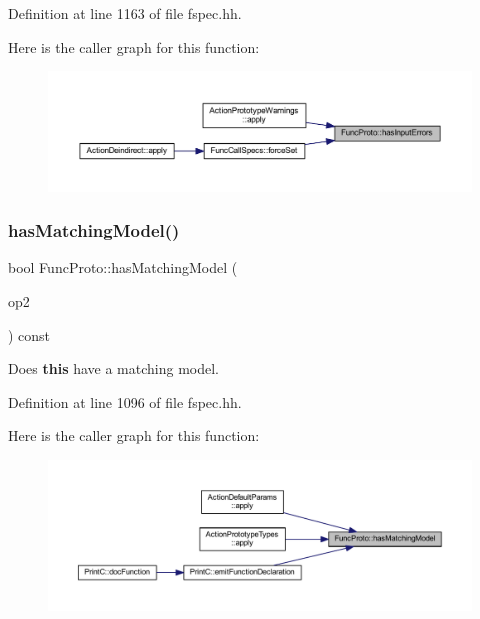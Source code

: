 Definition at line 1163 of file fspec.\+hh.

Here is the caller graph for this function\+:
\nopagebreak
\begin{figure}[H]
\begin{center}
\leavevmode
\includegraphics[width=350pt]{class_func_proto_abeba6c216afa6ad43160d69a10433fab_icgraph}
\end{center}
\end{figure}
\mbox{\label{class_func_proto_afeebd3dd7e300e1361977b93c72a8eed}} 
\subsubsection{\texorpdfstring{hasMatchingModel()}{hasMatchingModel()}\hspace{0.1cm}{\footnotesize\ttfamily [1/2]}}
{\footnotesize\ttfamily bool Func\+Proto\+::has\+Matching\+Model (\begin{DoxyParamCaption}\item[{const \mbox{\hyperlink{class_func_proto}{Func\+Proto}} $\ast$}]{op2 }\end{DoxyParamCaption}) const\hspace{0.3cm}{\ttfamily [inline]}}



Does {\bfseries{this}} have a matching model. 



Definition at line 1096 of file fspec.\+hh.

Here is the caller graph for this function\+:
\nopagebreak
\begin{figure}[H]
\begin{center}
\leavevmode
\includegraphics[width=350pt]{class_func_proto_afeebd3dd7e300e1361977b93c72a8eed_icgraph}
\end{center}
\end{figure}
\mbox{\label{class_func_proto_a6a86f7c68b557f329ab6193ffadfb768}} 
